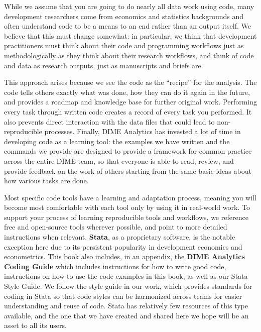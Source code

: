 While we assume that you are going to do nearly all data work using code,
many development researchers come from economics and statistics backgrounds
and often understand code to be a means to an end rather than an output itself.
We believe that this must change somewhat:
in particular, we think that development practitioners
must think about their code and programming workflows
just as methodologically as they think about their research workflows,
and think of code and data as research outputs, just as manuscripts and briefs are.

This approach arises because we see the code as the ``recipe'' for the analysis.
The code tells others exactly what was done,
how they can do it again in the future,
and provides a roadmap and knowledge base for further original work.\cite{hamermesh2007replication}
Performing every task through written code
creates a record of every task you performed.\cite{ozier2019replication}
It also prevents direct interaction
with the data files that could lead to non-reproducible processes.\cite{chang2015economics}
Finally, DIME Analytics has invested a lot of time in developing code as a learning tool:
the examples we have written and the commands we provide
are designed to provide a framework for common practice
across the entire DIME team, so that everyone is able to
read, review, and provide feedback on the work of others
starting from the same basic ideas about how various tasks are done.

Most specific code tools have a learning and adaptation process,
meaning you will become most comfortable with each tool
only by using it in real-world work.
To support your process of learning reproducible tools and workflows,
we reference free and open-source tools wherever possible,
and point to more detailed instructions when relevant.
\textbf{Stata},\cite{statacorp2019stata} 
as a proprietary software, is the notable exception here
due to its persistent popularity in development economics and econometrics.
This book also includes, in an appendix,
the \textbf{DIME Analytics Coding Guide} 
which includes instructions for how to write good code,
instructions on how to use the code examples in this book,
as well as our Stata Style Guide.
We follow the style guide in our work, which provides
standards for coding in Stata so that code styles
can be harmonized across teams for easier understanding and reuse of code.
Stata has relatively few resources of this type available,
and the one that we have created and shared here
we hope will be an asset to all its users.

